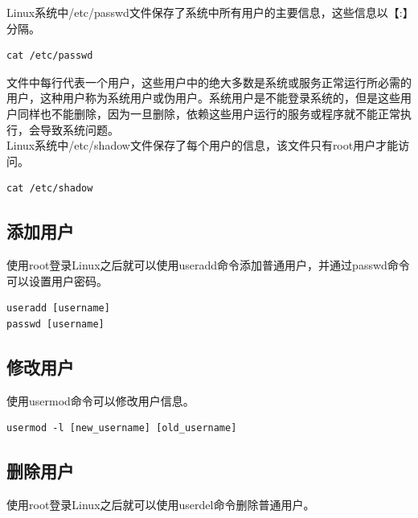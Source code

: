 \documentclass[12pt, openany, oneside]{book}
\begin{document}
Linux系统中/etc/passwd文件保存了系统中所有用户的主要信息，这些信息以【:】分隔。

\vspace{-0.5cm}

\begin{lstlisting}
cat /etc/passwd
\end{lstlisting}

文件中每行代表一个用户，这些用户中的绝大多数是系统或服务正常运行所必需的用户，这种用户称为系统用户或伪用户。系统用户是不能登录系统的，但是这些用户同样也不能删除，因为一旦删除，依赖这些用户运行的服务或程序就不能正常执行，会导致系统问题。\\

Linux系统中/etc/shadow文件保存了每个用户的信息，该文件只有root用户才能访问。

\vspace{-0.5cm}

\begin{lstlisting}
cat /etc/shadow
\end{lstlisting}

\subsection{添加用户}

使用root登录Linux之后就可以使用useradd命令添加普通用户，并通过passwd命令可以设置用户密码。

\vspace{-0.5cm}

\begin{lstlisting}
useradd [username]
passwd [username]
\end{lstlisting}

\subsection{修改用户}

使用usermod命令可以修改用户信息。

\vspace{-0.5cm}

\begin{lstlisting}
usermod -l [new_username] [old_username]
\end{lstlisting}

\subsection{删除用户}

使用root登录Linux之后就可以使用userdel命令删除普通用户。
\end{document}
